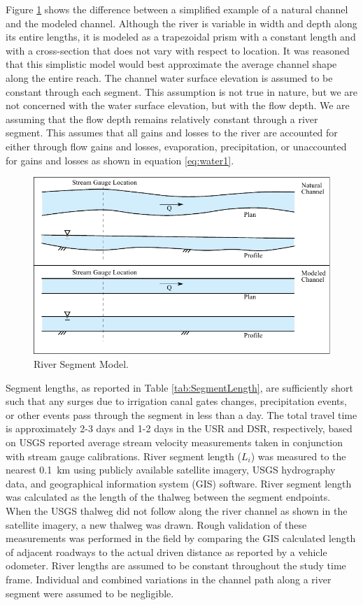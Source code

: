 Figure \ref{fig:segment model} shows the difference between a simplified example of a natural channel and the modeled channel.  Although the river is variable in width and depth along its entire lengths, it  is modeled as a trapezoidal prism with a constant length and with a cross-section that does not vary with respect to location.  It was reasoned that this simplistic model would best approximate the average channel shape along the entire reach.  The channel water surface elevation is assumed to be constant through each segment.  This assumption is not true in nature, but we are not concerned with the water surface elevation, but with the flow depth.  We are assuming that the flow depth remains relatively constant through a river segment.  This assumes that all gains and losses to the river are accounted for either through flow gains and losses, evaporation, precipitation, or unaccounted for gains and losses as shown in equation \ref{eq:water1}.
\begin{figure}[htbp]
	\centering
		\includegraphics[width=6.5in]{"Figures/LineDiagram/PlanProfile"}
		\caption[River Segment Model.]{River Segment Model.}
		\label{fig:segment model}
\end{figure}

Segment lengths, as reported in Table \ref{tab:SegmentLength}, are sufficiently short such that any surges due to irrigation canal gates changes, precipitation events, or other events pass through the segment in less than a day.  The total travel time is approximately 2-3 days and 1-2 days in the USR and DSR, respectively, based on USGS reported average stream velocity measurements taken in conjunction with stream gauge calibrations.  River segment length ($L_i$) was measured to the nearest \SI{0.1}{\kilo\meter} using publicly available satellite imagery, USGS hydrography data, and geographical information system (GIS) software.  River segment length was calculated as the length of the thalweg between the segment endpoints.  When the USGS thalweg did not follow along the river channel as shown in the satellite imagery, a new thalweg was drawn.  Rough validation of these measurements was performed in the field by comparing the GIS calculated length of adjacent roadways to the actual driven distance as reported by a vehicle odometer.  River lengths are assumed to be constant throughout the study time frame.  Individual and combined variations in the channel path along a river segment were assumed to be negligible.\\

